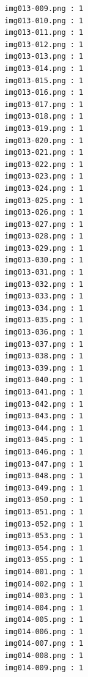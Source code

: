 \documentclass[12pt,a4paper]{article}
\begin{document}
\begin{lstlisting}
                     img013-009.png : 1
                     img013-010.png : 1
                     img013-011.png : 1
                     img013-012.png : 1
                     img013-013.png : 1
                     img013-014.png : 1
                     img013-015.png : 1
                     img013-016.png : 1
                     img013-017.png : 1
                     img013-018.png : 1
                     img013-019.png : 1
                     img013-020.png : 1
                     img013-021.png : 1
                     img013-022.png : 1
                     img013-023.png : 1
                     img013-024.png : 1
                     img013-025.png : 1
                     img013-026.png : 1
                     img013-027.png : 1
                     img013-028.png : 1
                     img013-029.png : 1
                     img013-030.png : 1
                     img013-031.png : 1
                     img013-032.png : 1
                     img013-033.png : 1
                     img013-034.png : 1
                     img013-035.png : 1
                     img013-036.png : 1
                     img013-037.png : 1
                     img013-038.png : 1
                     img013-039.png : 1
                     img013-040.png : 1
                     img013-041.png : 1
                     img013-042.png : 1
                     img013-043.png : 1
                     img013-044.png : 1
                     img013-045.png : 1
                     img013-046.png : 1
                     img013-047.png : 1
                     img013-048.png : 1
                     img013-049.png : 1
                     img013-050.png : 1
                     img013-051.png : 1
                     img013-052.png : 1
                     img013-053.png : 1
                     img013-054.png : 1
                     img013-055.png : 1
                     img014-001.png : 1
                     img014-002.png : 1
                     img014-003.png : 1
                     img014-004.png : 1
                     img014-005.png : 1
                     img014-006.png : 1
                     img014-007.png : 1
                     img014-008.png : 1
                     img014-009.png : 1




\end{lstlisting}
\end{document}
